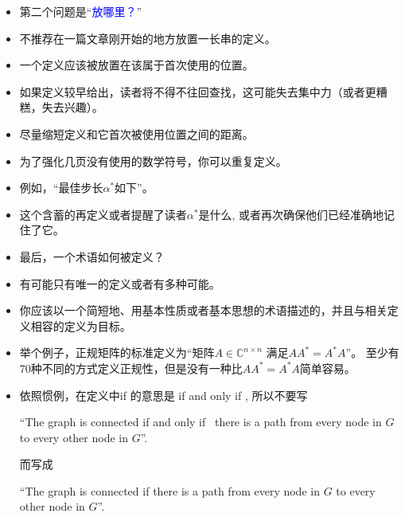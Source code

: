 \documentclass[13pt]{ctexbeamer}
\newcommand{\blue}[1]{\textcolor{blue}{#1}}
\begin{document}
\begin{frame}
	\begin{itemize}
		\item  第二个问题是``\blue{放哪里？}''
		\item 不推荐在一篇文章刚开始的地方放置一长串的定义。
		\item  一个定义应该被放置在该属于首次使用的位置。
		\item 如果定义较早给出，读者将不得不往回查找，这可能失去集中力（或者更糟糕，失去兴趣）。
		\item 尽量缩短定义和它首次被使用位置之间的距离。
	\end{itemize}
\end{frame}


\begin{frame}
	\begin{itemize}
		\item  为了强化几页没有使用的数学符号，你可以重复定义。

		\item 例如，``最佳步长$\alpha^{*}$如下''。

		\item  这个含蓄的再定义或者提醒了读者$\alpha^{*}$是什么, 或者再次确保他们已经准确地记住了它。
	\end{itemize}
\end{frame}


\begin{frame}
	\begin{itemize}
		\item  最后，一个术语如何被定义？
		\item 有可能只有唯一的定义或者有多种可能。
		\item 你应该以一个简短地、用基本性质或者基本思想的术语描述的，并且与相关定义相容的定义为目标。
		\item 举个例子，正规矩阵的标准定义为“矩阵$A\in \mathbb{C}^{n\times n}$ 满足$AA^{*}= A^{*}A$”。 至少有70种不同的方式定义正规性，但是没有一种比$AA^{*}= A^{*}A$简单容易。
	\end{itemize}
\end{frame}


\begin{frame}
	\begin{itemize}
		\item 依照惯例，在定义中if 的意思是 if and only if , 所以不要写

		``The graph is connected  \alert{if and only if }~there is a path from every node in $G$ to every other node in $G$''.

		而写成

		``The graph is connected \alert{if}  there is a path from every node in $G$ to every other node in $G$''.

	\end{itemize}
\end{frame}
\end{document}
